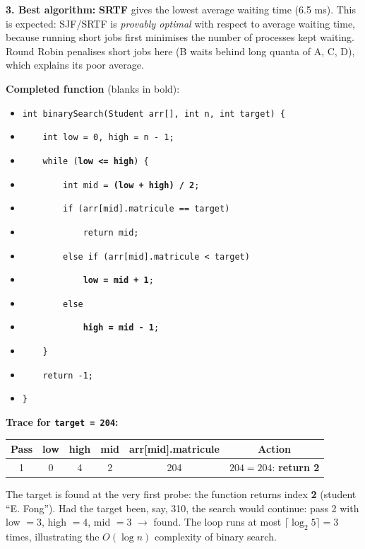 \documentclass[11pt]{article}
\begin{document}
\begin{corrige}
\textbf{3. Best algorithm:} \textbf{SRTF} gives the lowest average waiting time (6.5 ms). This is expected: SJF/SRTF is \emph{provably optimal} with respect to average waiting time, because running short jobs first minimises the number of processes kept waiting. Round Robin penalises short jobs here (B waits behind long quanta of A, C, D), which explains its poor average.
\end{corrige}

\begin{corrige}
\textbf{Completed function} (blanks in bold):
\begin{itemize}
\item[] \texttt{int binarySearch(Student arr[], int n, int target) \{}
\item[] \texttt{\ \ \ \ int low = 0, high = n - 1;}
\item[] \texttt{\ \ \ \ while (}\textbf{\texttt{low <= high}}\texttt{) \{}
\item[] \texttt{\ \ \ \ \ \ \ \ int mid = }\textbf{\texttt{(low + high) / 2}}\texttt{;}
\item[] \texttt{\ \ \ \ \ \ \ \ if (arr[mid].matricule == target)}
\item[] \texttt{\ \ \ \ \ \ \ \ \ \ \ \ return mid;}
\item[] \texttt{\ \ \ \ \ \ \ \ else if (arr[mid].matricule < target)}
\item[] \texttt{\ \ \ \ \ \ \ \ \ \ \ \ }\textbf{\texttt{low = mid + 1}}\texttt{;}
\item[] \texttt{\ \ \ \ \ \ \ \ else}
\item[] \texttt{\ \ \ \ \ \ \ \ \ \ \ \ }\textbf{\texttt{high = mid - 1}}\texttt{;}
\item[] \texttt{\ \ \ \ \}}
\item[] \texttt{\ \ \ \ return -1;}
\item[] \texttt{\}}
\end{itemize}

\textbf{Trace for \texttt{target = 204}:}
\begin{center}
\begin{tabular}{|c|c|c|c|c|c|}\hline
\rowcolor{popblueL} Pass & low & high & mid & arr[mid].matricule & Action \\ \hline
1 & 0 & 4 & 2 & 204 & $204 = 204$: \textbf{return 2} \\ \hline
\end{tabular}
\end{center}
The target is found at the very first probe: the function returns index \textbf{2} (student ``E. Fong''). Had the target been, say, 310, the search would continue: pass 2 with low $=3$, high $=4$, mid $=3$ $\rightarrow$ found. The loop runs at most $\lceil \log_2 5 \rceil = 3$ times, illustrating the $O(\log n)$ complexity of binary search.
\end{corrige}
\end{document}
